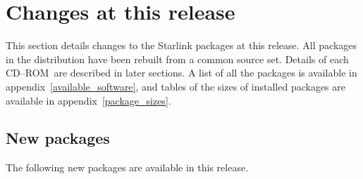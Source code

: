\documentclass[twoside,11pt]{article}
\newcommand{\xlabel}[1]{}
\renewcommand{\_}{\texttt{\symbol{95}}}
\newcommand{\cdrom}{CD--ROM}
\newcommand{\cdrom}{CD-ROM}
\begin{document}
\newpage
\section{\xlabel{changes_this_release}Changes at this release}
\label{changes_this_release}

This section details changes to the Starlink packages at this release.
All packages in the distribution have been rebuilt from a common source set.
Details of each \cdrom\ are described in later sections.  A list of all
the packages is available in appendix~\ref{available_software}, and tables
of the sizes of installed packages are available in 
appendix~\ref{package_sizes}.

\subsection{\xlabel{new_packages}New packages}
\label{new_packages}

The following new packages are available in this release.
\end{document}
